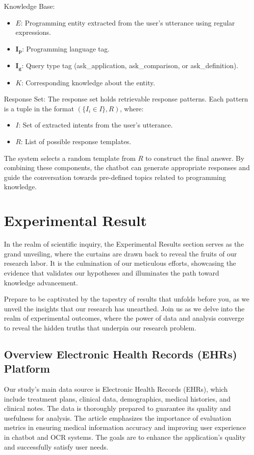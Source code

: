 \documentclass[conference]{IEEEtran}
\begin{document}
    Knowledge Base:
    \begin{itemize}
        \item \(E\): Programming entity extracted from the user's utterance using regular expressions.
        \item \(\mathbf{I_p}\): Programming language tag.
        \item \(\mathbf{I_g}\): Query type tag (ask\_application, ask\_comparison, or ask\_definition).
        \item \(K\): Corresponding knowledge about the entity.
    \end{itemize}
    Response Set:
    The response set holds retrievable response patterns. Each pattern is a tuple in the format \((\{I_i \in I\}, R)\), where:
    
    \begin{itemize}
        \item \(I\): Set of extracted intents from the user's utterance.
        \item \(R\): List of possible response templates.
    \end{itemize}
    The system selects a random template from \(R\) to construct the final answer. By combining these components, the chatbot can generate appropriate responses and guide the conversation towards pre-defined topics related to programming knowledge.

\section{Experimental Result}
\label{experimental}
    In the realm of scientific inquiry, the Experimental Results section serves as the grand unveiling, where the curtains are drawn back to reveal the fruits of our research labor. It is the culmination of our meticulous efforts, showcasing the evidence that validates our hypotheses and illuminates the path toward knowledge advancement.
    
    Prepare to be captivated by the tapestry of results that unfolds before you, as we unveil the insights that our research has unearthed. Join us as we delve into the realm of experimental outcomes, where the power of data and analysis converge to reveal the hidden truths that underpin our research problem.
    \subsection{Overview Electronic Health Records (EHRs) Platform}
    Our study's main data source is Electronic Health Records (EHRs), which include treatment plans, clinical data, demographics, medical histories, and clinical notes. The data is thoroughly prepared to guarantee its quality and usefulness for analysis. The article emphasizes the importance of evaluation metrics in ensuring medical information accuracy and improving user experience in chatbot and OCR systems. The goals are to enhance the application's quality and successfully satisfy user needs.
    
\end{document}
